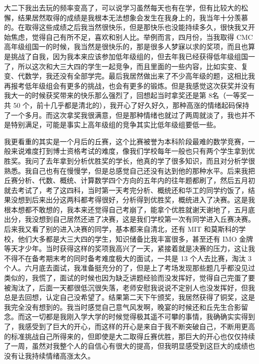 \documentclass{ctexart}
\theoremstyle{plain}
\theoremstyle{definition}
\theoremstyle{remark}
\begin{document}
大二下我出去玩的频率变高了，可以说学习虽然每天也有在学，但有比较大的松懈，结果居然取得的成绩是我根本无法想象会发生在我身上的，我当年十分羡慕的。在取得这些成绩之后我当然很快乐，但是那快乐也没能持续多久，很快我又开始焦虑，觉得自己有所不足，喜欢和别人比。举例而言，四月份，当我取得 CMC 高年级组国一的时候，我当然是很快乐的，那是很多人梦寐以求的奖项，而且也算是挑战了自我，因为我本来应该参加低年级组的，但去年我已经获得低年级组国一了，所以这次和大三大四的学生一起竞争，而且里面的一些内容，比如实变、复变、代数学，我还没有全部学完。最后我居然做出来了不少高年级的题，这相比我再报考低年级组会有更多的挑战，也会有更多的锻炼。但是我感觉这次获奖并没有我大一的时候获奖带来的快乐那么强烈了，回想起当时拿奖还是第 8名（一等奖一共 50 个，前十几乎都是清北的），我开心了好久好久，那种高涨的情绪起码保持了一个多月。而这次拿奖我很满意，但是那种情绪也就过了两周就淡了，我也并不是特别满足，可能是事实上高年级组的竞争其实比低年级组要低一些。

我更看重的其实是一个月后的丘赛，这个比赛被誉为本科阶段最难的数学竞赛，一般来说难度打到博士资格考试的难度，像我们学校每年一般也只有两个学生拿到优胜奖。我问了去年拿到分析优胜奖的学长，他真的学了很多知识，而且对分析学很熟悉。我自己也有在慢慢学，但是总感觉自己还没有达到他的那种水平。后来我把丘赛分析、代数、概统、计算数学四个方向的五年内的往年题都刷了，然后五月初就去考试了，考了这四科，当时第一天考完分析、概统还和华工的同学约饭了，结果没想到后来出分这两科都考得很好，分析得到优胜奖，概统进入了决赛。这是我根本想都不敢想的，我本来还觉得自己考崩了，能拿个优胜就谢天谢地了，五月底出分，我没想到自己居然还进了决赛，这是我们学校第一次有同学进入丘赛决赛。后来我又看了别的进入决赛的同学，基本都来自清北，还有 MIT 和莫斯科的学校，他们大多都是大三大四的学生，知识储备比我丰富很多，甚至还有 IMO 金牌等天才少年。当时获得这样的奖项我高兴了一天，紧接着就是决赛的压力，这让我不得不在备考期末考的同时备考难度极大的面试，一共是 13 个人去比赛，淘汰 3 个人。六月底去面试，我准备挺充分的了，但是上了考场发现那些题几乎都没见过类似的，我慌了，面试的时候也因为缺乏讲题经验而没发挥好，觉得自己完蛋了要被淘汰了，后面一天都很低沉很失落，老师安慰我说说不定别人也没发挥好，但我总是去回想，认定自己没希望了。结果第二天下午颁奖，我居然获得了铜奖，这是我完全没有想到的。我当时感觉自己意气风发啊，晚宴的时候还和丘先生合影留念。而这一切都是我刚入学大学的时候觉得极其遥不可攀的事情，我确确实实得到了，我感受到了巨大的开心，而这样的开心是来自于我不断突破自己，不断用更高的标准挑战自己所得来的，但即使是大二取得丘赛优胜，那巨大的开心也仅仅持续了一周，虽然对我整个人的自信心有很大的提高，但我明显感受到这巨大的成绩也没有让我持续情绪高涨太久。
\end{document}
